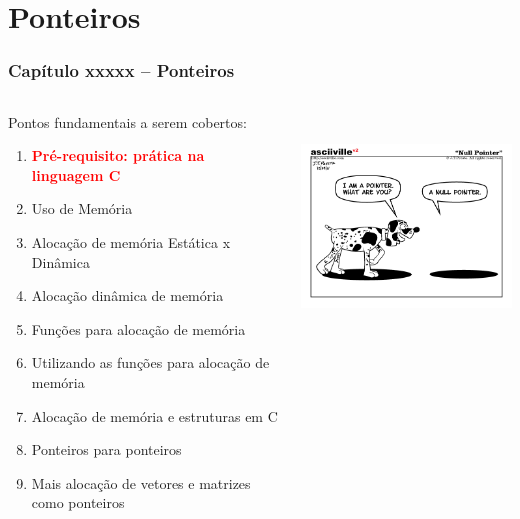 
\section{Ponteiros}

\begin{frame}[allowframebreaks=0.7]

\frametitle{\Large Capítulo xxxxx -- Ponteiros}
\begin{columns}
\begin{column}{.4\textwidth}
\centering
Pontos fundamentais a serem cobertos:
  
  \begin{small}
  \begin{enumerate}
  \item \textbf{\textcolor{red}{Pré-requisito: prática na linguagem C}}
  \item Uso de Memória
  \item Alocação de memória Estática x Dinâmica
  \item Alocação dinâmica de memória
  \item  Funções para alocação de memória
  \item  Utilizando as funções para alocação de memória
  \item  Alocação de memória e estruturas em C
  \item  Ponteiros para ponteiros
  \item Mais alocação de vetores e matrizes como ponteiros
\end{enumerate}  
  \end{small}
  
\end{column}

\begin{column}{.6\textwidth}
\vskip -1.5cm

\includegraphics[height=6cm, width=7cm]{figs/fig_ponteiros/nulo-pointer.png}
\end{column}

\end{columns}

\end{frame}



